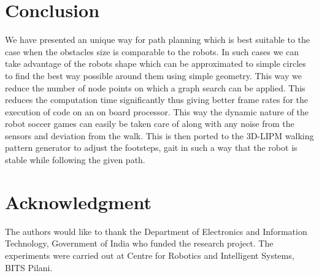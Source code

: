 \documentclass[letterpaper, 10 pt, conference]{ieeeconf}  %
\begin{document}
\section{Conclusion}
We have presented an unique way for path planning which is best suitable to the case when the obstacles size is comparable to the robots. In such cases we can take advantage of the robots shape which can be approximated to simple circles to find the best way possible around them using simple geometry. This way we reduce the number of node points on which a graph search can be applied. This reduces the computation time significantly thus giving better frame rates for the execution of code on an on board processor. This way the dynamic nature of the robot soccer games can easily be taken care of along with any noise from the sensors and deviation from the walk. This is then ported to the 3D-LIPM walking pattern generator to adjust the footsteps, gait in such a way that the robot is stable while following the given path. 
\\
 











\section{Acknowledgment}


The authors would like to thank the Department of Electronics and Information Technology, Government of India who funded the research project. The experiments were carried out at Centre for Robotics and Intelligent Systems, BITS Pilani.

\addtolength{\textheight}{-12cm}  
\end{document}
